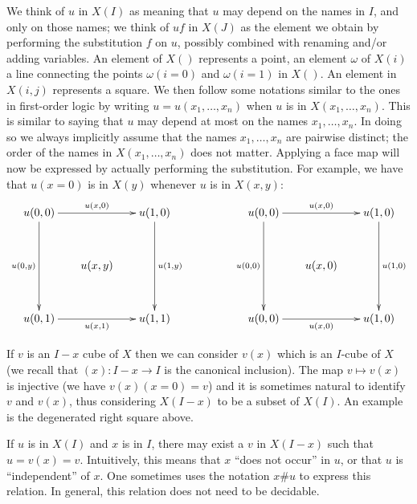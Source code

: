 \documentclass[10pt,a4paper]{article}
\begin{document}
We think of $u$ in $X(I)$ as meaning that $u$ may depend on the names
in $I$, and only on those names; we think of $uf$ in $X(J)$ as the
element we obtain by performing the substitution $f$ on $u$, possibly
combined with renaming and/or adding variables.  An element of $X()$
represents a point, an element $\omega$ of $X(i)$ a line connecting
the points $\omega(i=0)$ and $\omega(i=1)$ in $X()$. An element in
$X(i,j)$ represents a square.  We then follow some notations similar
to the ones in first-order logic by writing $u = u(x_1,\dots,x_n)$
when $u$ is in $X(x_1,\dots,x_n)$. This is similar to saying that $u$
may depend at most on the names $x_1,\dots,x_n$.  In doing so we
always implicitly assume that the names $x_1,\dots,x_n$ are pairwise
distinct; the order of the names in $X(x_1,\dots,x_n)$ does not
matter. Applying a face map will now be expressed by actually
performing the substitution. For example, we have that $u(x=0)$ is in
$X(y)$ whenever $u$ is in $X(x,y)$:
\[
\xymatrix@R=1.1cm@C=.6cm{
u(0,0)\ar[rr]^{u(x,0)}\ar[dd]_{u(0,y)}&      & u(1,0)\ar[dd]^{u(1,y)}   &&&
u(0,0)\ar[rr]^{u(x,0)}\ar[dd]_{u(0,0)}&      & u(1,0)\ar[dd]^{u(1,0)}       \\
                                      &u(x,y)&                          &&&
                                      &u(x,0)&                              \\
u(0,1)\ar[rr]_{u(x,1)}                &      & u(1,1)                   &&&
u(0,0)\ar[rr]_{u(x,0)}                &      & u(1,0)                       \\
}
\]

If $v$ is an $I-x$ cube of $X$ then we can consider $v(x)$ which is an
$I$-cube of $X$ (we recall that $(x):I-x\to I$ is the canonical
inclusion). The map $v\longmapsto v(x)$ is injective (we have
$v(x)(x=0) = v$) and it is sometimes natural to identify $v$ and
$v(x)$, thus considering $X(I-x)$ to be a subset of $X(I)$. An example
is the degenerated right square above.

 If $u$ is in $X(I)$ and $x$ is in $I$, there may exist a $v$ in $X(I-x)$ such that
$u = v(x) = v$.  Intuitively, this means that $x$ ``does not occur'' in $u$, or that $u$ is
``independent'' of $x$. One sometimes uses the notation $x\#u$ to express this relation. In general, this relation does
not need to be decidable.
\end{document}
